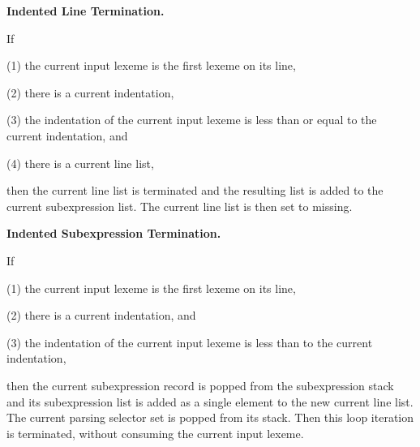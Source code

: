\documentclass[12pt]{article}
\newenvironment{indpar}[1][0.3in]%
	{\begin{list}{}%
		     {\setlength{\itemsep}{0in}%
		      \setlength{\topsep}{0in}%
		      \setlength{\parsep}{1ex}%
		      \setlength{\labelwidth}{#1}%
		      \setlength{\leftmargin}{#1}%
		      \addtolength{\leftmargin}{\labelsep}}%
	 \item}%
	{\end{list}}
\begin{document}
\begin{indpar}
{\bf Indented Line Termination.}
\begin{indpar}
If
\begin{list}{}
	     {\setlength{\itemsep}{0ex}%
	      \setlength{\topsep}{0ex}%
	      \setlength{\parsep}{0ex}%
	      \setlength{\leftmargin}{0.5in}%
	      \setlength{\rightmargin}{0.5in}}%
\item[(1)] the current input lexeme is the first lexeme on its line,
\item[(2)] there is a current indentation,
\item[(3)] the indentation of the current input lexeme is less than or equal
to the current indentation, and
\item[(4)] there is a current line list,
\end{list}
then the current line list is terminated and the resulting list
is added to the current subexpression list.  The current line list
is then set to missing.
\end{indpar}

{\bf Indented Subexpression Termination.}%
\begin{indpar}
If
\begin{list}{}
	     {\setlength{\itemsep}{0ex}%
	      \setlength{\topsep}{0ex}%
	      \setlength{\parsep}{0ex}%
	      \setlength{\leftmargin}{0.5in}%
	      \setlength{\rightmargin}{0.5in}}%
\item[(1)] the current input lexeme is the first lexeme on its line,
\item[(2)] there is a current indentation, and
\item[(3)] the indentation of the current input lexeme is less than
to the current indentation,
\end{list}
then the current subexpression record is popped from the subexpression
stack and its subexpression list is added as a single element to the
new current line list.  The current parsing selector set is popped
from its stack.  Then this loop iteration is terminated, without
consuming the current input lexeme.
\end{indpar}


\end{indpar}
\end{document}
